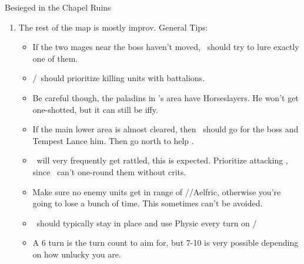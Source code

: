 \begin{battle}{Besieged in the Chapel Ruins}
\begin{multicols}{2}
\begin{enumerate}
\item The rest of the map is mostly improv. General Tips:
\begin{itemize}
\item If the two mages near the boss haven't moved, \Dimitri\ should try to lure exactly one of them.
\item \Dimitri/\Balthus\ should prioritize killing units with battalions.
\item Be careful though, the paladins in \Dimitri's area have Horseslayers. He won't get one-shotted, but it can still be iffy.
\item If the main lower area is almost cleared, then \Dimitri\ should go for the boss and Tempest Lance him. Then go north to help \Byleth.
\item \Byleth\ will very frequently get rattled, this is expected. Prioritize attacking , since \Byleth\ can't one-round them without crits.
\item Make sure no enemy units get in range of \Linhardt/\Ashe/Aelfric, otherwise you're going to lose a bunch of time. This sometimes can't be avoided.
\item \Linhardt\ should typically stay in place and use Physic every turn on \Dimitri/\Byleth
\item A 6 turn is the turn count to aim for, but 7-10 is very possible depending on how unlucky you are.
\end{itemize}

\end{enumerate}

\end{multicols}

\end{battle}